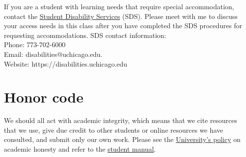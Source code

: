 \documentclass[12pt]{article}
\begin{document}
If you are a student with learning needs that require special accommodation, contact the \href{https://disabilities.uchicago.edu}{Student Disability Services} (SDS). 
Please meet with me to discuss your access needs in this class after you have completed the SDS procedures for requesting accommodations.
SDS contact information: \\
Phone: 773-702-6000 \\
Email: disabilities@uchicago.edu. \\
Website: https://disabilities.uchicago.edu 

\section{Honor code}

We should all act with academic integrity, which means that 
we cite resources that we use, give due credit to other students or online resources we have consulted, and submit only our own work.
Please see the \href{https://studentmanual.uchicago.edu/academic-policies/academic-honesty-plagiarism/}{University's policy} on academic honesty and 
refer to the \href{https://studentmanual.uchicago.edu/academic-policies/academic-honesty-plagiarism/}{student manual}.


\end{document}

